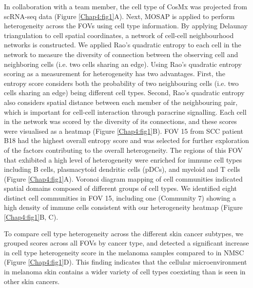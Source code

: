 In collaboration with a team member, the cell type of CosMx was projected from scRNA-seq data (Figure \ref{Chap4:fig1}A). Next, MOSAP is applied to perform heterogeneity across the FOVs using cell type information. By applying Delaunay triangulation to cell spatial coordinates, a network of cell-cell neighbourhood networks is constructed. We applied Rao’s quadratic entropy to each cell in the network to measure the diversity of connection between the observing cell and neighboring cells (i.e. two cells sharing an edge). Using Rao’s quadratic entropy scoring as a measurement for heterogeneity has two advantages. First, the entropy score considers both the probability of two neighbouring cells (i.e. two cells sharing an edge) being different cell types. Second, Rao’s quadratic entropy also considers spatial distance between each member of the neighbouring pair, which is important for cell-cell interaction through paracrine signalling. Each cell in the network was scored by the diversity of its connections, and these scores were visualised as a heatmap (Figure \ref{Chap4:fig1}B). FOV 15 from SCC patient B18 had the highest overall entropy score and was selected for further exploration of the factors contributing to the overall heterogeneity. The regions of this FOV that exhibited a high level of heterogeneity were enriched for immune cell types including B cells, plasmacytoid dendritic cells (pDCs), and myeloid and T cells (Figure \ref{Chap4:fig1}A). Voronoi diagram mapping of cell communities indicated spatial domains composed of different groups of cell types. We identified eight distinct cell communities in FOV 15, including one (Community 7) showing a high density of immune cells consistent with our heterogeneity heatmap (Figure \ref{Chap4:fig1}B, C).  

To compare cell type heterogeneity across the different skin cancer subtypes, we grouped scores across all FOVs by cancer type, and detected a significant increase in cell type heterogeneity score in the melanoma samples compared to in NMSC (Figure \ref{Chap4:fig1}D). This finding indicates that the cellular microenvironment in melanoma skin contains a wider variety of cell types coexisting than is seen in other skin cancers.

